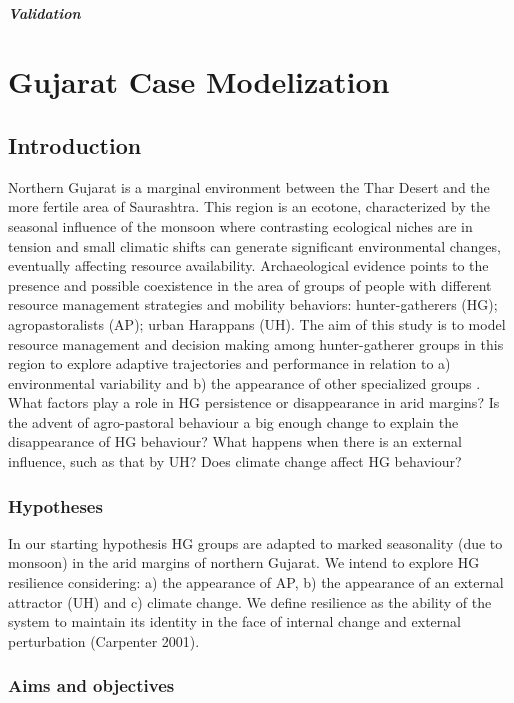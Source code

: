 \documentclass{report}
\begin{document}
			\paragraph{Validation}

\newpage 
\chapter{Gujarat Case Modelization} %
	\section{Introduction}
Northern Gujarat is a marginal environment between the Thar Desert and the more fertile area of Saurashtra. This region is an ecotone, characterized by the seasonal influence of the monsoon where contrasting ecological niches are in tension and small climatic shifts can generate significant environmental changes, eventually affecting  resource availability. Archaeological evidence points to the presence and possible coexistence in the area of groups of people with different resource management strategies and mobility behaviors: hunter-gatherers (HG); agropastoralists (AP); urban Harappans (UH).
The aim of this study is to model resource management and decision making among hunter-gatherer groups in this region to explore adaptive trajectories and performance in relation to a) environmental variability and b) the appearance of other specialized groups . 
What factors play a role in HG persistence or disappearance in arid margins? Is the advent of agro-pastoral behaviour a big enough change to explain the disappearance of HG behaviour? What happens when there is an external influence, such as that by UH? Does climate change affect HG behaviour?
	    \subsection{Hypotheses}
In our starting hypothesis HG groups are adapted to marked seasonality (due to monsoon) in the arid margins of northern Gujarat. We intend to explore HG resilience considering: a) the appearance of AP, b) the appearance of an external attractor (UH) and c) climate change. We define resilience as the ability of the system to maintain its identity in the face of internal change and external perturbation (Carpenter 2001).
	    \subsection{Aims and objectives}
\end{document}
